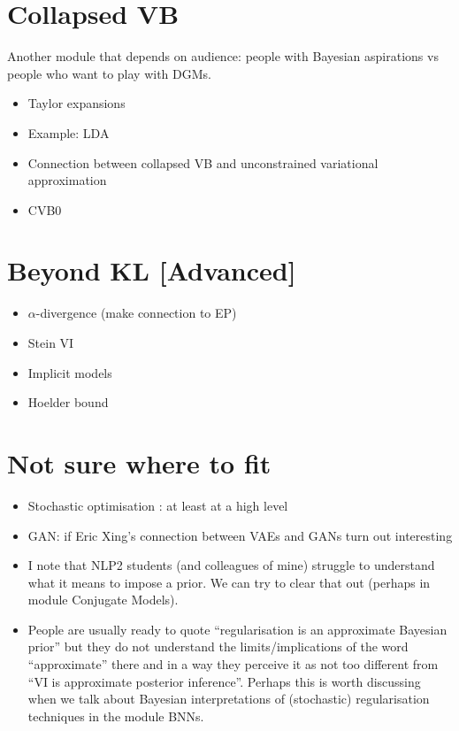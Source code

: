 \documentclass[11pt, a4paper]{article}
\begin{document}
\section{Collapsed VB}

Another module that depends on audience: people with Bayesian aspirations vs people who want to play with DGMs.

\begin{itemize}
\item Taylor expansions
\item Example: LDA
\item Connection between collapsed VB and unconstrained variational approximation \citep{TehEtAl:2007}
\item CVB0 \citep{AsuncionEtAl:2009}
\end{itemize}

\section{Beyond KL [Advanced]}
\begin{itemize}
\item $ \alpha $-divergence (make connection to EP)
\item Stein VI
\item Implicit models
\item Hoelder bound
\end{itemize}

\section{Not sure where to fit}

\begin{itemize}
	\item Stochastic optimisation \citep{RobbinsEtAl:1951}: at least at a high level
	\item GAN: if Eric Xing's connection between VAEs and GANs turn out interesting
	\item I note that NLP2 students (and colleagues of mine) struggle to understand what it means to impose a prior. We can try to clear that out (perhaps in module Conjugate Models).
	\item People are usually ready to quote ``regularisation is an approximate Bayesian prior'' but they do not understand the limits/implications of the word ``approximate'' there and in a way they perceive it as not too different from ``VI is approximate posterior inference''. Perhaps this is worth discussing when we talk about Bayesian interpretations of (stochastic) regularisation techniques in the module BNNs.
\end{itemize}



\end{document}

